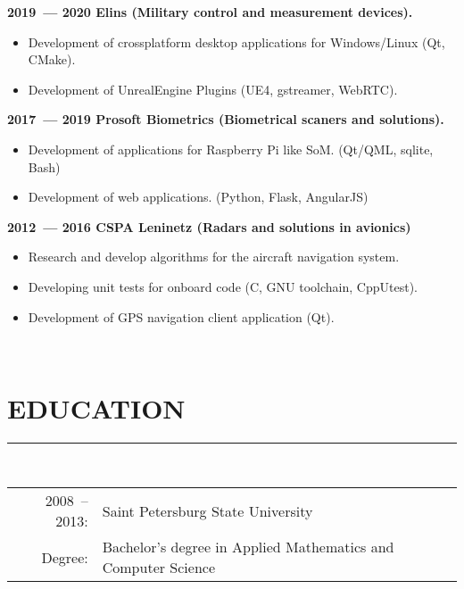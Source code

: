 \documentclass[a4paper,oneside,12pt]{article}
\newcommand{\cvpart}[1]{%
\vspace{-1em}%
\section*{\large\bfseries\MakeTextUppercase{#1}}%
\vspace{-1em}%
\rule{\linewidth}{0.3em}\\[-.3em]%
}
\begin{document}
{\bf
2019~--- 2020 Elins (Military control and measurement devices).
}
\begin{itemize}
    \item Development of crossplatform desktop applications for Windows/Linux (Qt, CMake).
    \item Development of UnrealEngine Plugins (UE4, gstreamer, WebRTC).
\end{itemize}

{\bf
2017~--- 2019 Prosoft Biometrics (Biometrical scaners and solutions).
}
\begin{itemize}
    \item Development of applications for Raspberry Pi like SoM. (Qt/QML, sqlite, Bash)
    \item Development of web applications. (Python, Flask, AngularJS)
\end{itemize}

{\bf
2012~--- 2016 CSPA Leninetz (Radars and solutions in avionics)
}

\begin{itemize}
    \item Research and develop algorithms for the aircraft navigation system.
    \item Developing unit tests for onboard code (C, GNU toolchain, CppUtest).
    \item Development of GPS navigation client application (Qt). 
\end{itemize}


~\\

\cvpart{Education}

\begin{tabularx}{\textwidth}{rX}
  2008~-- 2013:& Saint Petersburg State University\\
        Degree:& Bachelor's degree in Applied Mathematics and Computer Science\\  
\end{tabularx}
\end{document}
